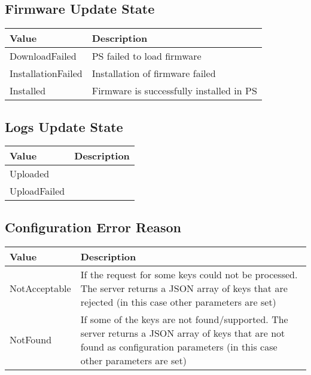 \subsection{Firmware Update State}
\label{types:FirmwareState}

\begin{tabularx}{\linewidth}{ | l | X | }
  \hline
  \rowcolor{table-head}
  Value & Description \\
  \hline
  DownloadFailed 		& \acs{PS} failed to load firmware \\
  InstallationFailed 	& Installation of firmware failed \\
  Installed				& Firmware is successfully installed in \acs{PS} \\
  \hline
\end{tabularx}

\subsection{Logs Update State}
\label{types:LogUpdateState}

\begin{tabularx}{\linewidth}{ | l | X | }
  \hline
  \rowcolor{table-head}
  Value & Description \\
  \hline
  Uploaded 		&  \\
  UploadFailed 	&  \\
  \hline
\end{tabularx}

\subsection{Configuration Error Reason}
\label{types:ConfigErrorReason}

\begin{tabularx}{\linewidth}{ | l | X | }
  \hline
  \rowcolor{table-head}
  Value & Description \\
  \hline
  NotAcceptable 		& If the request for some keys could not be processed. The server returns a JSON array of keys that are rejected (in this case other parameters are set) \\
  NotFound 	& If some of the keys are not found/supported. The server returns a JSON array of keys that are not found as configuration parameters (in this case other parameters are set) \\
  \hline
\end{tabularx}

%
